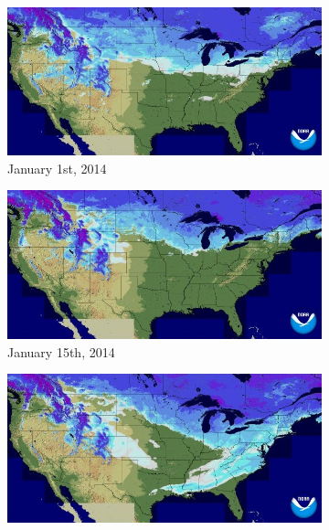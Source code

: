 \documentclass[10pt,twocolumn,letterpaper]{article}
\begin{document}
\begin{figure}
  \centering
  \begin{subfigure}[b]{0.33\textwidth}
    \centering
		\includegraphics[width=\textwidth, trim= 0mm 0mm 0mm 0mm]{figs/snow_gt_1.jpg}
    \caption{January 1st, 2014}
    \label{fig:snow_map_1}
  \end{subfigure}
  \begin{subfigure}[b]{0.33\textwidth}
    \centering
		\includegraphics[width=\textwidth, trim= 0mm 0mm 0mm 0mm]{figs/snow_gt_2.jpg}
    \caption{January 15th, 2014}
    \label{fig:snow_map_2}
  \end{subfigure}
  \begin{subfigure}[b]{0.33\textwidth}
    \centering
		\includegraphics[width=\textwidth, trim= 0mm 0mm 0mm 0mm]{figs/snow_gt_3.jpg}

\end{subfigure}
\end{figure}
\end{document}
